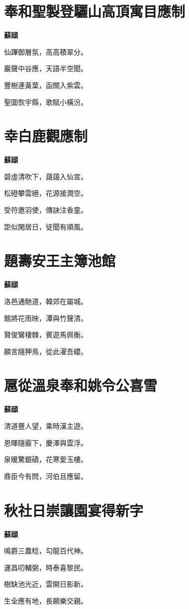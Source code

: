 \documentclass[12pt,a4paper]{ctexbook}
\begin{document}
\section{奉和聖製登驪山高頂寓目應制}
\textbf{蘇頲}\par\vspace{0.5em}
仙蹕御層氛，高高積翠分。\par
巖聲中谷應，天語半空聞。\par
豐樹連黃葉，函關入紫雲。\par
聖圖恢宇縣，歌賦小橫汾。\par

\section{幸白鹿觀應制}
\textbf{蘇頲}\par\vspace{0.5em}
碧虛清吹下，藹藹入仙宮。\par
松磴攀雲絕，花源接澗空。\par
受符邀羽使，傳訣注香童。\par
詎似閑居日，徒聞有順風。\par

\section{題壽安王主簿池館}
\textbf{蘇頲}\par\vspace{0.5em}
洛邑通馳道，韓郊在屬城。\par
館將花雨映，潭與竹聲清。\par
賢俊鸞棲棘，賓遊馬佩衡。\par
願言隨狎鳥，從此濯吾纓。\par

\section{扈從溫泉奉和姚令公喜雪}
\textbf{蘇頲}\par\vspace{0.5em}
清道豐人望，乘時漢主遊。\par
恩暉隨霰下，慶澤與雲浮。\par
泉暖驚銀磧，花寒愛玉樓。\par
鼎臣今有問，河伯且應留。\par

\section{秋社日崇讓園宴得新字}
\textbf{蘇頲}\par\vspace{0.5em}
鳴爵三農稔，勾龍百代神。\par
運昌叨輔弼，時泰喜黎民。\par
樹缺池光近，雲開日影新。\par
生全應有地，長願樂交親。\par
\end{document}
